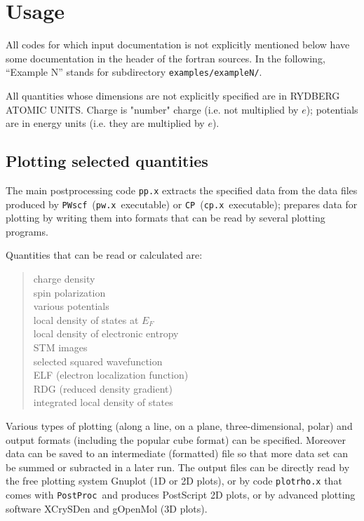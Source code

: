 \documentclass[12pt,a4paper]{article}
\def\pwx{\texttt{pw.x}}
\def\cpx{\texttt{cp.x}}
\def\PWscf{\texttt{PWscf}}
\def\CP{\texttt{CP}}
\def\PostProc{\texttt{PostProc}}
\begin{document}
\section{Usage}

All codes for which input documentation is not explicitly mentioned below
have some documentation in the header of the fortran sources.
In the following, ``Example N'' stands for subdirectory 
\texttt{examples/exampleN/}.

All quantities whose dimensions are not explicitly specified are in
RYDBERG ATOMIC UNITS. Charge is "number" charge (i.e. not multiplied 
by $e$); potentials are in energy units (i.e. they are multiplied by 
$e$).

\subsection{Plotting selected quantities}
  
The main postprocessing code \texttt{pp.x} extracts the specified data
from the data files produced by \PWscf\ (\pwx\ executable) or \CP\ 
(\cpx\ executable); prepares data for plotting by writing them into 
formats that can be read by several plotting programs.

Quantities that can be read or calculated are:
\begin{quote}
      charge density\\
      spin polarization\\
      various potentials\\
      local density of states at $E_F$\\
      local density of electronic entropy\\
      STM images\\
      selected squared wavefunction\\
      ELF (electron localization function)\\
      RDG (reduced density gradient)\\
      integrated local density of states
\end{quote}
Various types of plotting (along a line, on a plane, three-dimensional, polar)
and output formats (including the popular cube format) can be specified.
Moreover data can be saved to an intermediate (formatted) file so that
more data set can be summed or subracted in a later run.
The output files can be directly read by the free plotting system Gnuplot
(1D or 2D plots), or by code \texttt{plotrho.x} that comes with \PostProc\ 
and produces PostScript 2D plots,
or by advanced plotting software XCrySDen and gOpenMol (3D plots).
\end{document}
